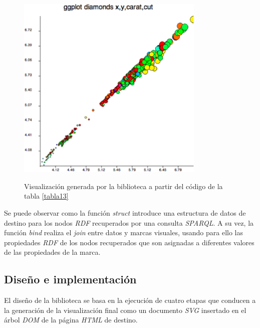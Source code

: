 \begin{figure}
\vspace{2.4in}
\centering
\caption{Visualizaci\'on generada por la biblioteca a partir del c\'odigo de la tabla \ref{tabla13}}
\vspace{5mm}
\includegraphics[width=0.8\textwidth]{figura7}
\label{figura7}
\end{figure}

Se puede observar como la funci\'on \textit{struct} introduce una estructura de datos de destino para los nodos \textit{RDF} recuperados por una consulta \textit{SPARQL}. A su vez, la funci\'on \textit{bind} realiza el \textit{join} entre datos y marcas visuales, usando para ello las propiedades \textit{RDF} de los nodos recuperados que son asignadas a diferentes valores de las propiedades de la marca.

\subsection{Dise\~no e implementaci\'on}

El dise\~no de la biblioteca se basa en la ejecuci\'on de cuatro etapas que conducen a la generaci\'on de la visualizaci\'on final como un documento \textit{SVG} insertado en el \'arbol \textit{DOM} de la p\'agina \textit{HTML} de destino.

